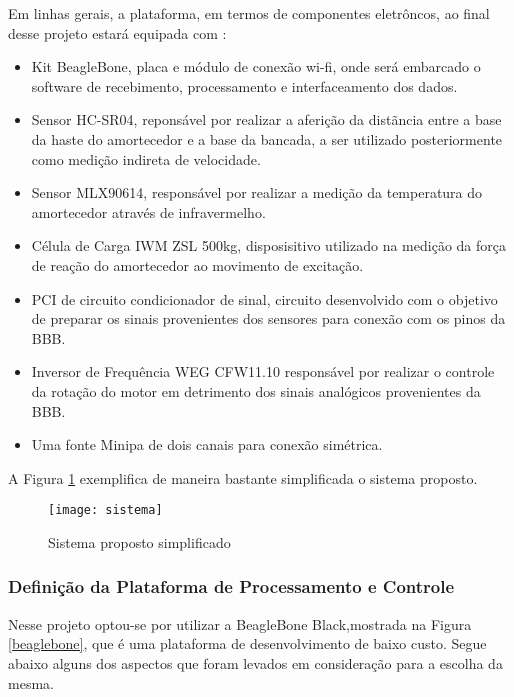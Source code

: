 	Em linhas gerais, a plataforma, em termos de componentes eletrôncos, ao final desse projeto estará equipada com :

	\begin{itemize}

	\item Kit BeagleBone, placa e módulo de conexão wi-fi, onde será embarcado o software de recebimento, processamento e interfaceamento dos dados.
	\item Sensor HC-SR04, reponsável por realizar a aferição da distãncia entre a base da haste do amortecedor e a base da bancada, a ser utilizado posteriormente como medição indireta de velocidade.
	\item Sensor MLX90614, responsável por realizar a medição da temperatura do amortecedor através de infravermelho.
	\item Célula de Carga IWM ZSL 500kg, disposisitivo utilizado na medição da força de reação do amortecedor ao movimento de excitação.
	\item PCI de circuito condicionador de sinal, circuito desenvolvido com o objetivo de preparar os sinais provenientes dos sensores para conexão com os pinos da BBB. 
	\item Inversor de Frequência WEG CFW11.10 responsável por realizar o controle da rotação do motor em detrimento dos sinais analógicos provenientes da BBB.
	\item Uma fonte Minipa de dois canais para conexão simétrica.
	\end{itemize}		

	A Figura \ref{sistema} exemplifica de maneira bastante simplificada o sistema proposto. 

	\begin{figure}[!h]
		\centering
		\texttt{[image: sistema]}
		\caption{Sistema proposto simplificado}
		\label{sistema}
	\end{figure}


\subsubsection{Definição da Plataforma de Processamento e Controle}

	Nesse projeto optou-se por utilizar a BeagleBone Black,mostrada na Figura \ref{beaglebone}, que é uma plataforma de desenvolvimento de baixo custo. Segue abaixo alguns dos aspectos que foram levados em consideração para a escolha da mesma.

